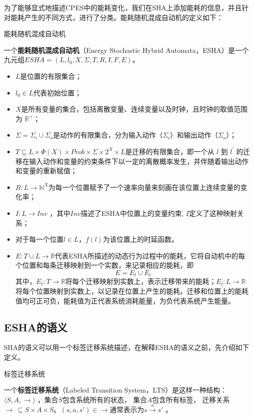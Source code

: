 	为了能够显式地描述CPES中的能耗变化，我们在SHA上添加能耗的信息，并且针对能耗产生的不同方式，进行了分类。能耗随机混成自动机的定义如下：
	\begin{myDef}能耗随机混成自动机\end{myDef}	
	一个\textbf{能耗随机混成自动机}（Energy Stochastic Hybrid Automata，ESHA）是一个九元组$ESHA = (L,l_{0},X,\Sigma,T,R,I,F,E)$。
	\begin{itemize}
	\item $L$是位置的有限集合；
	\item $l_{0} \in L$代表初始位置；
	\item $X$是所有变量的集合，包括离散变量、连续变量以及时钟，且时钟的取值范围为 $\mathbb{R^{+}}$；
	\item $\Sigma = \Sigma_{i} \cup \Sigma_{o} $是动作的有限集合，分为输入动作（$\Sigma_{i}$）和输出动作（$\Sigma_{o}$）；
	\item $T \subseteq L \times \Phi(X) \times Prob \times \Sigma \times 2^{X} \times L$是迁移的有限集合，即一个从 $l$ 到 $l^{'}$ 的迁移在输入动作和变量的约束条件下以一定的离散概率发生，并伴随着输出动作和变量的重新赋值；
	\item $R:L\rightarrow \mathbb{N}^X$为每一个位置赋予了一个速率向量来刻画在该位置上连续变量的变化率；
	\item $I : L \rightarrow Inv$ ，其中$Inv$描述了ESHA中位置上的变量约束, $I$定义了这种映射关系；
	\item 对于每一个位置$l \in L$，$f(l)$为该位置上的时延函数。
	\item $E:T \cup L \rightarrow \mathbb{R}$代表ESHA所描述的动态行为过程中的能耗，它将自动机中的每个位置和每条迁移映射到一个实数，来记录相应的能耗，即
	\begin{equation}
	E = E_{t} \cup E_{l}
	\end{equation}
	其中，$E_{t}:T \rightarrow \mathbb{R}$将每个迁移映射到实数上，表示迁移带来的能耗；$E_{l}:L \rightarrow \mathbb{R}$将每个位置映射到实数上，以记录在位置上产生的能耗。迁移和位置上的能耗值均可正可负，能耗值为正代表系统消耗能量，为负代表系统产生能量。
	\end{itemize}
	
\subsection{ESHA的语义}
	SHA的语义可以用一个标签迁移系统描述，在解释ESHA的语义之前，先介绍如下定义。

	\begin{myDef}标签迁移系统\end{myDef}
	一个\textbf{标签迁移系统}（Labeled Transition System，LTS）\citep{DBLP:journals/fm/Trybulec09}是这样一种结构： $\langle S, A, \longrightarrow\rangle$ 
，集合$S$包含系统所有的状态， 集合$A$包含所有标签， 迁移关系 $\longrightarrow\,\subseteq S\times A\times S$。$(s,a,s')\in\longrightarrow$通常表示为$s\stackrel{a}{\longrightarrow}s'$ 。
	
